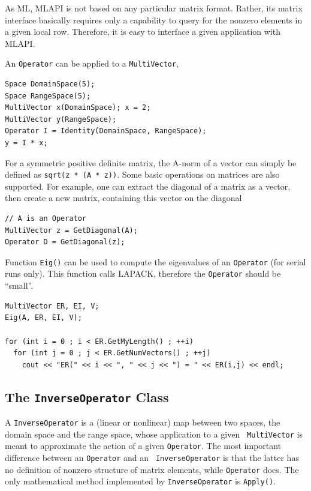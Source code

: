 \documentclass{article}[11pt]
\newcommand{\ML}     {{\sc ML}}
\newcommand{\MLAPI}  {{\sc MLAPI }}
\newcommand{\MLAPIns}  {{\sc MLAPI}}
\begin{document}
As \ML, \MLAPI is not based on any
particular matrix format. Rather, its matrix interface basically requires only
a capability to query for the nonzero elements in a given local row.
Therefore, it is easy to interface a given application with \MLAPIns.

\smallskip

An {\tt Operator} can be applied to a {\tt MultiVector},
\begin{verbatim}
Space DomainSpace(5);
Space RangeSpace(5);
MultiVector x(DomainSpace); x = 2;
MultiVector y(RangeSpace);
Operator I = Identity(DomainSpace, RangeSpace);
y = I * x;
\end{verbatim}

\smallskip

For a symmetric positive definite matrix, the A-norm of a vector can simply be
defined as \verb!sqrt(z * (A * z))!.
Some basic operations on matrices are also supported. For example,
one can extract the diagonal of a matrix as a vector, then create a new
matrix, containing this vector on the diagonal
\begin{verbatim}    
// A is an Operator
MultiVector z = GetDiagonal(A);
Operator D = GetDiagonal(z);
\end{verbatim}

Function {\tt Eig()} can be used to compute the eigenvalues of an
{\tt Operator}
(for serial runs only). This function calls LAPACK, therefore the
{\tt Operator} should be ``small''.
\begin{verbatim}    
MultiVector ER, EI, V;
Eig(A, ER, EI, V);

for (int i = 0 ; i < ER.GetMyLength() ; ++i)
  for (int j = 0 ; j < ER.GetNumVectors() ; ++j)
    cout << "ER(" << i << ", " << j << ") = " << ER(i,j) << endl;
\end{verbatim}

\subsection{The {\tt InverseOperator} Class}
\label{sec:inverseoperator}

A {\tt InverseOperator} is a (linear or nonlinear) map between two spaces, the
domain space and the range space, whose application to a given {\tt
  MultiVector} is meant to approximate the action of a given {\tt Operator}.
The most important difference between an {\tt Operator} and an {\tt
  InverseOperator} is that the latter has no definition of nonzero
  structure of matrix elements, while {\tt Operator} does. The only mathematical method implemented
  by {\tt InverseOperator} is {\tt Apply()}.
\end{document}

